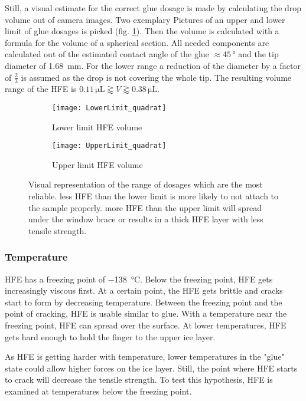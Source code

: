 Still, a visual estimate for the correct glue dosage is made by calculating the drop volume out of camera images. Two exemplary Pictures of an upper and lower limit of glue dosages is picked (fig. \ref{fig:rangeHFE}). Then the volume is calculated with a formula for the volume of a spherical section. All needed components are calculated out of the estimated contact angle of the glue $\approx 45\,\si{\degree}$ and the tip diameter of \SI{1.68}{\milli\meter}. For the lower range a reduction of the diameter by a factor of $\frac{2}{3}$ is assumed as the drop is not covering the whole tip. The resulting volume range of the HFE is $ 0.11\,\si{\micro\liter} \gtrapprox V \gtrapprox 0.38\,\si{\micro\liter}$.

\begin{figure}[hbt!]
	\centering
	\begin{subfigure}[]{0.45\textwidth}
		\centering
		\texttt{[image: LowerLimit\_quadrat]}
		\caption{Lower limit HFE volume}
	\end{subfigure}
	\begin{subfigure}[]{0.45\textwidth}
		\centering
		\texttt{[image: UpperLimit\_quadrat]}
		\caption{Upper limit HFE volume}
	\end{subfigure}
	\caption{Visual representation of the range of dosages which are the most reliable. less HFE than the lower limit is more likely to not attach to the sample properly. more HFE than the upper limit will spread under the window brace or results in a thick HFE layer with less tensile strength.}
	\label{fig:rangeHFE}
\end{figure}

\subsubsection{Temperature}

HFE has a freezing point of \SI{-138}{\degreeCelsius}. Below the freezing point, HFE gets increasingly viscous first. At a certain point, the HFE gets brittle and cracks start to form by decreasing temperature. Between the freezing point and the point of cracking, HFE is usable similar to glue. With a temperature near the freezing point, HFE can spread over the surface. At lower temperatures, HFE gets hard enough to hold the finger to the upper ice layer.

As HFE is getting harder with temperature, lower temperatures in the "glue" state could allow higher forces on the ice layer. Still, the point where HFE starts to crack will decrease the tensile strength. To test this hypothesis, HFE is examined at temperatures below the freezing point.


